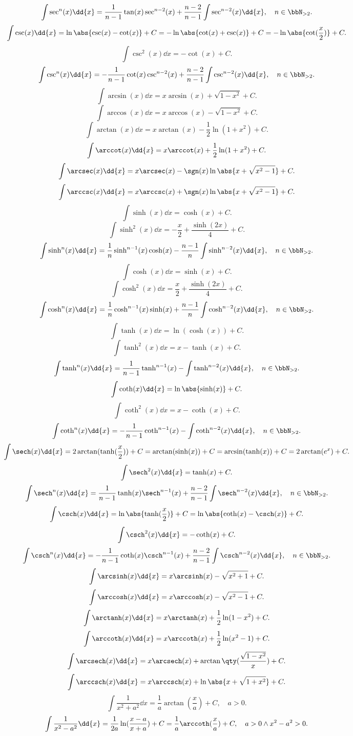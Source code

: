 \documentclass[a4paper,12pt]{article}
\begin{document}
\[\int\sec^n(x)\dd{x}=\frac{1}{n-1}\tan(x)\sec^{n-2}(x)+\frac{n-2}{n-1}\int\sec^{n-2}(x)\dd{x},\quad n\in\bbN_{>2}.\]
\[\int\csc(x)\dd{x}=\ln\abs{\csc(x)-\cot(x)}+C=-\ln\abs{\cot(x)+\csc(x)}+C=-\ln\abs{\cot(\frac{x}{2})}+C.\]
\[\int\csc^2(x)\dd{x}=-\cot(x)+C.\]
\[\int\csc^n(x)\dd{x}=-\frac{1}{n-1}\cot(x)\csc^{n-2}(x)+\frac{n-2}{n-1}\int\csc^{n-2}(x)\dd{x},\quad n\in\bbN_{>2}.\]
\[\int\arcsin(x)\dd{x}=x\arcsin(x)+\sqrt{1-x^2}+C.\]
\[\int\arccos(x)\dd{x}=x\arccos(x)-\sqrt{1-x^2}+C.\]
\[\int\arctan(x)\dd{x}=x\arctan(x)-\frac{1}{2}\ln(1+x^2)+C.\]
\[\int\arccot(x)\dd{x}=x\arccot(x)+\frac{1}{2}\ln(1+x^2)+C.\]
\[\int\arcsec(x)\dd{x}=x\arcsec(x)-\sgn(x)\ln\abs{x+\sqrt{x^2-1}}+C.\]
\[\int\arccsc(x)\dd{x}=x\arccsc(x)+\sgn(x)\ln\abs{x+\sqrt{x^2-1}}+C.\]
\[\int\sinh(x)\dd{x}=\cosh(x)+C.\]
\[\int\sinh^2(x)\dd{x}=-\frac{x}{2}+\frac{\sinh(2x)}{4}+C.\]
\[\int\sinh^n(x)\dd{x}=\frac{1}{n}\sinh^{n-1}(x)\cosh(x)-\frac{n-1}{n}\int\sinh^{n-2}(x)\dd{x},\quad n\in\bbN_{>2}.\]
\[\int\cosh(x)\dd{x}=\sinh(x)+C.\]
\[\int\cosh^2(x)\dd{x}=\frac{x}{2}+\frac{\sinh(2x)}{4}+C.\]
\[\int\cosh^n(x)\dd{x}=\frac{1}{n}\cosh^{n-1}(x)\sinh(x)+\frac{n-1}{n}\int\cosh^{n-2}(x)\dd{x},\quad n\in\bbN_{>2}.\]
\[\int\tanh(x)\dd{x}=\ln(\cosh(x))+C.\]
\[\int\tanh^2(x)\dd{x}=x-\tanh(x)+C.\]
\[\int\tanh^n(x)\dd{x}=\frac{1}{n-1}\tanh^{n-1}(x)-\int\tanh^{n-2}(x)\dd{x},\quad n\in\bbN_{>2}.\]
\[\int\coth(x)\dd{x}=\ln\abs{\sinh(x)}+C.\]
\[\int\coth^2(x)\dd{x}=x-\coth(x)+C.\]
\[\int\coth^n(x)\dd{x}=-\frac{1}{n-1}\coth^{n-1}(x)-\int\coth^{n-2}(x)\dd{x},\quad n\in\bbN_{>2}.\]
\[\int\sech(x)\dd{x}=2\arctan(\tanh(\frac{x}{2}))+C=\arctan(\sinh(x))+C=\arcsin(\tanh(x))+C=2\arctan(e^x)+C.\]
\[\int\sech^2(x)\dd{x}=\tanh(x)+C.\]
\[\int\sech^n(x)\dd{x}=\frac{1}{n-1}\tanh(x)\sech^{n-1}(x)+\frac{n-2}{n-1}\int\sech^{n-2}(x)\dd{x},\quad n\in\bbN_{>2}.\]
\[\int\csch(x)\dd{x}=\ln\abs{\tanh(\frac{x}{2})}+C=\ln\abs{\coth(x)-\csch(x)}+C.\]
\[\int\csch^2(x)\dd{x}=-\coth(x)+C.\]
\[\int\csch^n(x)\dd{x}=-\frac{1}{n-1}\coth(x)\csch^{n-1}(x)+\frac{n-2}{n-1}\int\csch^{n-2}(x)\dd{x},\quad n\in\bbN_{>2}.\]
\[\int\arcsinh(x)\dd{x}=x\arcsinh(x)-\sqrt{x^2+1}+C.\]
\[\int\arccosh(x)\dd{x}=x\arccosh(x)-\sqrt{x^2-1}+C.\]
\[\int\arctanh(x)\dd{x}=x\arctanh(x)+\frac{1}{2}\ln(1-x^2)+C.\]
\[\int\arccoth(x)\dd{x}=x\arccoth(x)+\frac{1}{2}\ln(x^2-1)+C.\]
\[\int\arcsech(x)\dd{x}=x\arcsech(x)+\arctan\qty(\frac{\sqrt{1-x^2}}{x})+C.\]
\[\int\arccsch(x)\dd{x}=x\arccsch(x)+\ln\abs{x+\sqrt{1+x^2}}+C.\]
\[\int\frac{1}{x^2+a^2}\dd{x}=\frac{1}{a}\arctan(\frac{x}{a})+C,\quad a>0.\]
\[\int\frac{1}{x^2-a^2}\dd{x}=\frac{1}{2a}\ln(\frac{x-a}{x+a})+C=\frac{1}{a}\arccoth(\frac{x}{a})+C,\quad a>0\land x^2-a^2>0.\]
\end{document}
